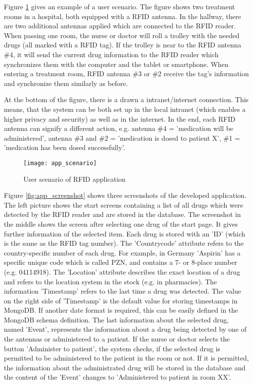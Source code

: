 Figure \ref{fig:appfunctionality} gives an example of a user scenario. The figure shows two treatment rooms in a hospital, both equipped with a RFID antenna. In the hallway, there are two additional antennas applied which are connected to the RFID reader. When passing one room, the nurse or doctor will roll a trolley with the needed drugs (all marked with a RFID tag). If the trolley is near to the RFID antenna \#4, it will send the current drug information to the RFID reader which synchronizes them with the computer and the tablet or smartphone. When entering a treatment room, RFID antenna \#3 or \#2 receive the tag's information and synchronize them similarly as before.

At the bottom of the figure, there is a drawn a intranet/internet connection. This means, that the system can be both set up in the local intranet (which enables a higher privacy and security) as well as in the internet. In the end, each RFID antenna can signify a different action, e.g. antenna \#4 = 'medication will be administered', antenna \#3 and \#2 = 'medication is dosed to patient X', \#1 = 'medication has been dosed successfully'.

\begin{figure}
\centering
\texttt{[image: app\_scenario]} 
\caption{\label{fig:appfunctionality}User scenario of RFID application} 
\end{figure}

Figure \ref{fig:app_screenshot} shows three screenshots of the developed application. The left picture shows the start screens containing a list of all drugs which were detected by the RFID reader and are stored in the database. The screenshot in the middle shows the screen after selecting one drug of the start page. It gives further information of the selected item. Each drug is stored with an 'ID' (which is the same as the RFID tag number). The 'Countrycode' attribute refers to the country-specific number of each drug. For example, in Germany 'Aspirin' has a specific unique code which is called \ac{PZN}, and contains a 7- or 8-place number (e.g. 04114918). The 'Location' attribute describes the exact location of a drug and refers to the location system in the stock (e.g. in pharmacies). The information 'Timestamp' refers to the last time a drug was detected. The value on the right side of 'Timestamp' is the default value for storing timestamps in MongoDB. If another date format is required, this can be easily defined in the MongoDB schema definition. The last information about the selected drug, named 'Event', represents the information about a drug being detected by one of the antennas or administered to a patient. If the nurse or doctor selects the button 'Administer to patient', the system checks, if the selected drug is permitted to be administered to the patient in the room or not. If it is permitted, the information about the administrated drug will be stored in the database and the content of the 'Event' changes to 'Administered to patient in room XX'.

